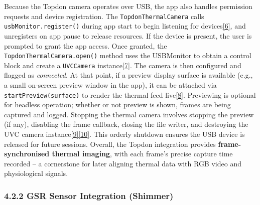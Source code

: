 \documentclass[12pt,a4paper]{article}
\begin{document}
Because the Topdon camera operates over USB, the app also handles permission requests and device registration. The \passthrough{\lstinline!TopdonThermalCamera!} calls \passthrough{\lstinline!usbMonitor.register()!} during app start to begin listening for devices\href{https://github.com/buccancs/GSR-Dual-Video-System/blob/05ae360cb7b4ae7c7861f72deb235ad64a74b38e/android/app/src/main/java/com/yourcompany/gsrcapture/hardware/TopdonThermalCamera.kt\#L28-L36}{{[}6{]}}, and unregisters on app pause to release resources. If the device is present, the user is prompted to grant the app access. Once granted, the \passthrough{\lstinline!TopdonThermalCamera.open()!} method uses the USBMonitor to obtain a control block and create a \passthrough{\lstinline!UVCCamera!} instance\href{https://github.com/buccancs/GSR-Dual-Video-System/blob/05ae360cb7b4ae7c7861f72deb235ad64a74b38e/android/app/src/main/java/com/yourcompany/gsrcapture/hardware/TopdonThermalCamera.kt\#L80-L88}{{[}7{]}}. The camera is then configured and flagged as \emph{connected}. At that point, if a preview display surface is available (e.g., a small on-screen preview window in the app), it can be attached via \passthrough{\lstinline!startPreview(surface)!} to render the thermal feed live\href{https://github.com/buccancs/GSR-Dual-Video-System/blob/05ae360cb7b4ae7c7861f72deb235ad64a74b38e/android/app/src/main/java/com/yourcompany/gsrcapture/hardware/TopdonThermalCamera.kt\#L36-L44}{{[}8{]}}. Previewing is optional for headless operation; whether or not preview is shown, frames are being captured and logged. Stopping the thermal camera involves stopping the preview (if any), disabling the frame callback, closing the file writer, and destroying the UVC camera instance\href{https://github.com/buccancs/GSR-Dual-Video-System/blob/05ae360cb7b4ae7c7861f72deb235ad64a74b38e/android/app/src/main/java/com/yourcompany/gsrcapture/hardware/TopdonThermalCamera.kt\#L66-L74}{{[}9{]}}\href{https://github.com/buccancs/GSR-Dual-Video-System/blob/05ae360cb7b4ae7c7861f72deb235ad64a74b38e/android/app/src/main/java/com/yourcompany/gsrcapture/hardware/TopdonThermalCamera.kt\#L76-L84}{{[}10{]}}. This orderly shutdown ensures the USB device is released for future sessions. Overall, the Topdon integration provides \textbf{frame-synchronised thermal imaging}, with each frame's precise capture time recorded -- a cornerstone for later aligning thermal data with RGB video and physiological signals.

\subsubsection{4.2.2 GSR Sensor Integration (Shimmer)}\label{gsr-sensor-integration-shimmer}
\end{document}
